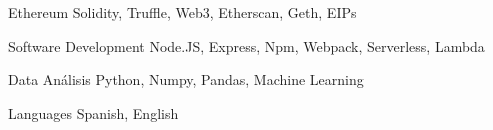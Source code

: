 

\begin{cvskills}

  \cvskill
    {Ethereum} %
    {Solidity, Truffle, Web3, Etherscan, Geth, EIPs} %

  \cvskill
    {Software Development} %
    {Node.JS, Express, Npm, Webpack, Serverless, Lambda} %

  \cvskill
    {Data Análisis} %
    {Python, Numpy, Pandas, Machine Learning} %

  \cvskill
    {Languages} %
    {Spanish, English} %

\end{cvskills}
